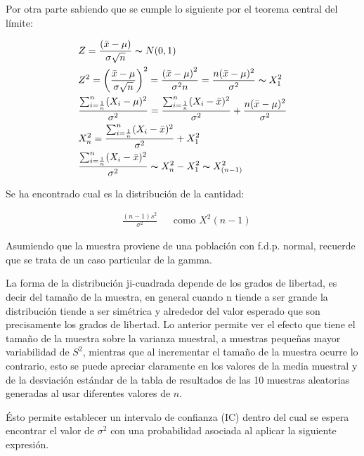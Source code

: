 Por otra parte sabiendo que se cumple lo siguiente
por el teorema central del límite:

\begin{align*}
     & Z=\frac{(\bar{x}-\mu)}{\sigma  \sqrt{n}}\thicksim  N (0,1)                                                                                                   \\
     & Z^2=\left( \frac{\bar{x}-\mu}{\sigma  \sqrt{n}} \right)^2=\frac{\left( \bar{x}-\mu \right)^2}{\sigma^2n}=\frac{n(\bar{x}-\mu )^2}{\sigma^2} \thicksim  X_1^2 \\
     & \frac{\sum_{i=\frac{1}{n}}^n(X_i-\mu )^2}{\sigma^2}=\frac{\sum_{i=\frac{1}{n}}^n(X_i-\bar{x} )^2}{\sigma^2}+\frac{n (\bar{x}-\mu  )^2}{\sigma^2}             \\
     & X_n^2=\frac{\sum_{i=\frac{1}{n}}^n(X_i-\bar{x} )^2}{\sigma^2}+X_1^2                                                                                          \\
     & \frac{\sum_{i=\frac{1}{n}}^n(X_i-\bar{x})^2}{\sigma^2} \thicksim  X_n^2-X_1^2 \thicksim  X^2_{( n-1 )}
\end{align*}


Se ha encontrado cual es la distribución de la cantidad:

\begin{align*}
     & \frac{(n-1 )s^2}{\sigma^2} &  & \text{como } X^2{( n-1 )}
\end{align*}

Asumiendo que la muestra proviene de una población con f.d.p.
normal, recuerde que se trata de un caso particular de la gamma.

La forma de la distribución ji-cuadrada depende de los grados de
libertad, es decir del tamaño de la muestra, en general cuando n
tiende a ser grande la distribución tiende a ser simétrica y alrededor
del valor esperado que son precisamente los grados de libertad.
Lo anterior permite ver el efecto que tiene el tamaño de la muestra
sobre la varianza muestral, a muestras pequeñas mayor
variabilidad de $S^2$, mientras que al incrementar el tamaño de la
muestra ocurre lo contrario, esto se puede apreciar claramente en
los valores de la media muestral y de la desviación estándar de la
tabla de resultados de las 10 muestras aleatorias generadas al usar
diferentes valores de $n$.

Ésto permite establecer un intervalo de confianza (IC) dentro del cual se espera
encontrar el valor de $\sigma^2$ con una probabilidad asociada al aplicar la siguiente
expresión.

